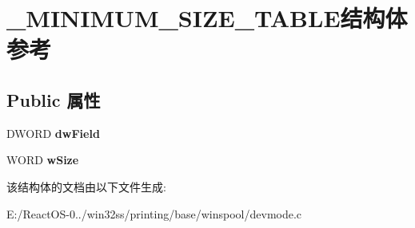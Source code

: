 \hypertarget{struct___m_i_n_i_m_u_m___s_i_z_e___t_a_b_l_e}{}\section{\+\_\+\+M\+I\+N\+I\+M\+U\+M\+\_\+\+S\+I\+Z\+E\+\_\+\+T\+A\+B\+L\+E结构体 参考}
\label{struct___m_i_n_i_m_u_m___s_i_z_e___t_a_b_l_e}
\subsection*{Public 属性}
\begin{DoxyCompactItemize}
\item 
\mbox{\label{struct___m_i_n_i_m_u_m___s_i_z_e___t_a_b_l_e_a01b4fef7d48e321e331a1e177baf8195}} 
D\+W\+O\+RD {\bfseries dw\+Field}
\item 
\mbox{\label{struct___m_i_n_i_m_u_m___s_i_z_e___t_a_b_l_e_aea71c84411851f394ec7af6c7ad3cf1c}} 
W\+O\+RD {\bfseries w\+Size}
\end{DoxyCompactItemize}


该结构体的文档由以下文件生成\+:\begin{DoxyCompactItemize}
\item 
E\+:/\+React\+O\+S-\/0../win32ss/printing/base/winspool/devmode.\+c\end{DoxyCompactItemize}
